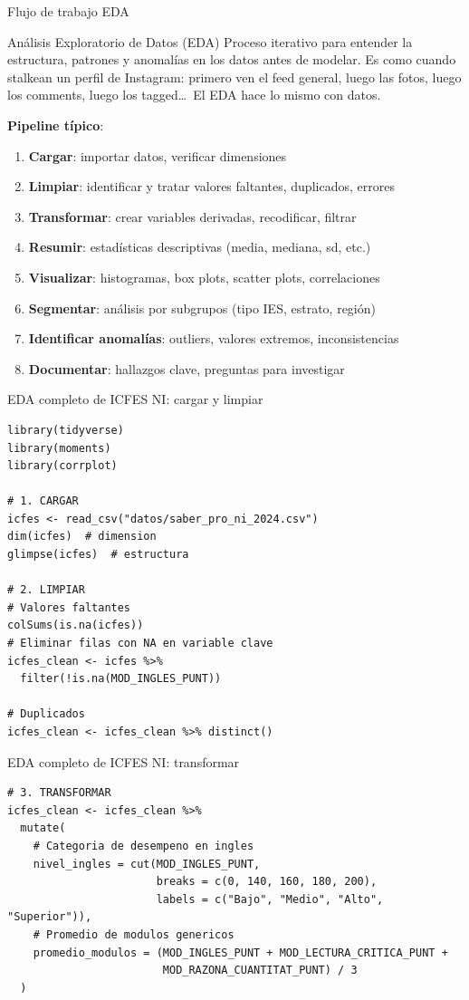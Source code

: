 \documentclass[aspectratio=169, 11pt]{beamer}
\begin{document}
\begin{frame}{Flujo de trabajo EDA}
\begin{block}{Análisis Exploratorio de Datos (EDA)}
Proceso iterativo para entender la estructura, patrones y anomal\'ias en los datos \alert{antes} de modelar. Es como cuando stalkean un perfil de Instagram: primero ven el feed general, luego las fotos, luego los comments, luego los tagged\ldots\ El EDA hace lo mismo con datos.
\end{block}

\textbf{Pipeline t\'ipico}:
\begin{enumerate}
\item \textbf{Cargar}: importar datos, verificar dimensiones
\item \textbf{Limpiar}: identificar y tratar valores faltantes, duplicados, errores
\item \textbf{Transformar}: crear variables derivadas, recodificar, filtrar
\item \textbf{Resumir}: estadísticas descriptivas (media, mediana, sd, etc.)
\item \textbf{Visualizar}: histogramas, box plots, scatter plots, correlaciones
\item \textbf{Segmentar}: análisis por subgrupos (tipo IES, estrato, región)
\item \textbf{Identificar anomalías}: outliers, valores extremos, inconsistencias
\item \textbf{Documentar}: hallazgos clave, preguntas para investigar
\end{enumerate}
\end{frame}

\begin{frame}[fragile]{EDA completo de ICFES NI: cargar y limpiar}
\small
\begin{lstlisting}
library(tidyverse)
library(moments)
library(corrplot)

# 1. CARGAR
icfes <- read_csv("datos/saber_pro_ni_2024.csv")
dim(icfes)  # dimension
glimpse(icfes)  # estructura

# 2. LIMPIAR
# Valores faltantes
colSums(is.na(icfes))
# Eliminar filas con NA en variable clave
icfes_clean <- icfes %>%
  filter(!is.na(MOD_INGLES_PUNT))

# Duplicados
icfes_clean <- icfes_clean %>% distinct()
\end{lstlisting}
\end{frame}

\begin{frame}[fragile]{EDA completo de ICFES NI: transformar}
\begin{lstlisting}
# 3. TRANSFORMAR
icfes_clean <- icfes_clean %>%
  mutate(
    # Categoria de desempeno en ingles
    nivel_ingles = cut(MOD_INGLES_PUNT,
                       breaks = c(0, 140, 160, 180, 200),
                       labels = c("Bajo", "Medio", "Alto", "Superior")),
    # Promedio de modulos genericos
    promedio_modulos = (MOD_INGLES_PUNT + MOD_LECTURA_CRITICA_PUNT +
                        MOD_RAZONA_CUANTITAT_PUNT) / 3
  )
\end{lstlisting}
\end{frame}
\end{document}

